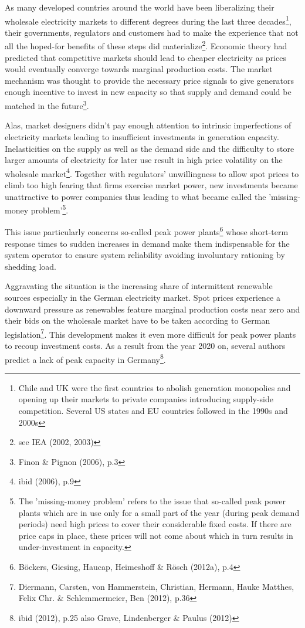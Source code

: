 \documentclass[11pt,a4paper,english]{scrreprt}
\begin{document}
As many developed countries around the world have been liberalizing their
wholesale electricity markets to different degrees during the last three
decades\footnote{Chile and UK were the first countries to abolish generation
monopolies and opening up their markets to private companies introducing
supply-side competition. Several US states and EU countries followed in the
1990s and 2000s}, their governments, regulators and customers had to make the
experience that not all the hoped-for benefits of these steps did
materialize\footnote{see IEA (2002, 2003)}. Economic theory had predicted that
competitive markets should lead to cheaper electricity as prices would
eventually converge towards marginal production costs. The market mechanism was
thought to provide the necessary price signals to give generators enough
incentive to invest in new capacity so that supply and demand could be matched
in the future\footnote{Finon \& Pignon (2006), p.3}.\par

Alas, market designers didn't pay enough attention to intrinsic imperfections
of electricity markets leading to insufficient investments in generation
capacity. Inelasticities on the supply as well as the demand side and the
difficulty to store larger amounts of electricity for later use result in high
price volatility on the wholesale market\footnote{ibid (2006), p.9}.
Together with regulators' unwillingness to allow spot prices to climb too high
fearing that firms exercise market power, new investments became unattractive to
power companies thus leading to what became called the 'missing-money
problem'\footnote{The 'missing-money problem' refers to the issue that so-called
peak power plants which are in use only for a small part of the year (during
peak demand periods) need high prices to cover their considerable fixed costs.
If there are price caps in place, these prices will not come about which in turn
results in under-investment in capacity.}.\par

This issue particularly concerns so-called peak power
plants\footnote{B\"{o}ckers, Giesing, Haucap, Heimeshoff \& R\"{o}sch (2012a),
p.4} whose short-term response times to sudden increases in demand make them
indispensable for the system operator to ensure system reliability avoiding
involuntary rationing by shedding load.\par

Aggravating the situation is the increasing share of intermittent renewable
sources especially in the German electricity market. Spot prices experience a
downward pressure as renewables feature marginal production costs near zero and
their bids on the wholesale market have to be taken according to German
legislation\footnote{Diermann, Carsten, von Hammerstein, Christian, Hermann,
Hauke Matthes, Felix Chr. \& Schlemmermeier, Ben (2012), p.36}. This development
makes it even more difficult for peak power plants to recoup investment costs.
As a result from the year 2020 on, several authors predict a lack of peak
capacity in Germany\footnote{ibid (2012), p.25 also Grave, Lindenberger \&
Paulus (2012)}.\par
\end{document}
